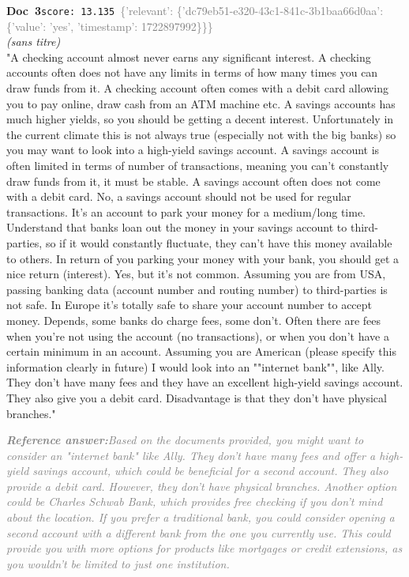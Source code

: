 \documentclass[a4paper,11pt]{article}
\begin{document}
\begin{docenv}
{\footnotesize\textcolor{doccolor}{\textbf{Doc~3}}}\hfill{\tiny\texttt{score:~13.135}}\ {\tiny\textcolor{gray}{\{'relevant': \{'dc79eb51-e320-43c1-841c-3b1baa66d0aa': \{'value': 'yes', 'timestamp': 1722897992\}\}\}}}\\[3pt]
{\small\textit{(sans titre)}}\\[2pt]
\vspace{2pt}
{\footnotesize 
"A checking account almost never earns any significant interest. A checking accounts often does not have any limits in terms of how many times you can draw funds from it. A checking account often comes with a debit card allowing you to pay online, draw cash from an ATM machine etc. A savings accounts has much higher yields, so you should be getting a decent interest. Unfortunately in the current climate this is not always true (especially not with the big banks) so you may want to look into a high-yield savings account. A savings account is often limited in terms of number of transactions, meaning you can't constantly draw funds from it, it must be stable. A savings account often does not come with a debit card. No, a savings account should not be used for regular transactions. It's an account to park your money for a medium/long time. Understand that banks loan out the money in your savings account to third-parties, so if it would constantly fluctuate, they can't have this money available to others. In return of you parking your money with your bank, you should get a nice return (interest). Yes, but it's not common. Assuming you are from USA, passing banking data (account number and routing number) to third-parties is not safe. In Europe it's totally safe to share your account number to accept money. Depends, some banks do charge fees, some don't. Often there are fees when you're not using the account (no transactions), or when you don't have a certain minimum in an account. Assuming you are American (please specify this information clearly in future) I would look into an ""internet bank"", like Ally. They don't have many fees and they have an excellent high-yield savings account. They also give you a debit card. Disadvantage is that they don't have physical branches."}
\end{docenv}
\begin{refanswerenv}
{\footnotesize\textit{\textcolor{gray}{\textbf{Reference answer:}\enspace Based on the documents provided, you might want to consider an "internet bank" like Ally. They don't have many fees and offer a high-yield savings account, which could be beneficial for a second account. They also provide a debit card. However, they don't have physical branches. Another option could be Charles Schwab Bank, which provides free checking if you don't mind about the location. If you prefer a traditional bank, you could consider opening a second account with a different bank from the one you currently use. This could provide you with more options for products like mortgages or credit extensions, as you wouldn't be limited to just one institution.}}}
\end{refanswerenv}
\end{document}
